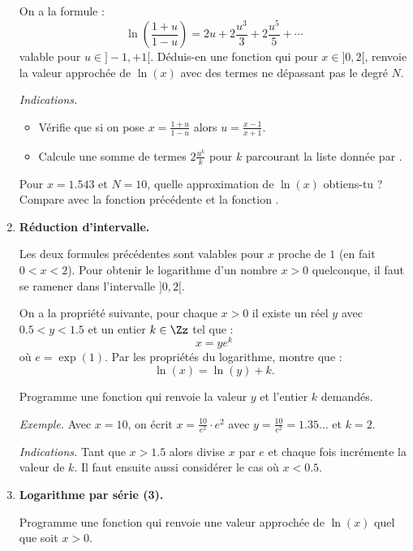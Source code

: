 \documentclass[11pt,class=report,crop=false]{standalone}
\begin{document}
\begin{activite}
\begin{enumerate}
    On a la formule :
    $$\ln\left(\frac{1+u}{1-u}\right) = 2u + 2\frac{u^3}{3} + 2\frac{u^5}{5}  + \cdots $$
    valable pour $u \in ]-1,+1[$.
    Déduis-en une fonction  qui pour $x \in ]0,2[$, renvoie la valeur approchée de $\ln(x)$ avec des termes ne dépassant pas le degré $N$. 
    
    \emph{Indications.}
    \begin{itemize}
      \item Vérifie que si on pose $x=\frac{1+u}{1-u}$ alors $u = \frac{x-1}{x+1}$.
            
      \item Calcule une somme de termes $2\frac{u^k}{k}$ pour $k$ parcourant la liste donnée par .
      
    \end{itemize}
       
    Pour $x = 1.543$ et $N=10$, quelle approximation de $\ln(x)$ obtiens-tu ? Compare avec la fonction précédente et la fonction \Python{}.
    
       
    \item \textbf{Réduction d'intervalle.} 
    
    Les deux formules précédentes sont valables pour $x$ proche de $1$ (en fait $0 < x < 2$). Pour obtenir le logarithme d'un nombre $x>0$ quelconque, il faut se ramener dans l'intervalle $]0,2[$.
    
    On a la propriété suivante, pour chaque $x>0$ il existe un réel $y$ avec $0.5 < y < 1.5$ et un entier $k \in \Zz$ tel que :
    $$x = y e^k$$
    où $e=\exp(1)$. Par les propriétés du logarithme, montre que :
    $$\ln(x) = \ln(y) + k.$$
    
    Programme une fonction  qui renvoie la valeur $y$ et l'entier $k$ demandés. 
    
    	\emph{Exemple.} Avec $x=10$, on écrit $x = \frac{10}{e^2} \cdot e^2$ avec
    	$y =\frac{10}{e^2} = 1.35\ldots$ et $k=2$.
    	
    \emph{Indications.} Tant que $x>1.5$ alors divise $x$ par $e$ et chaque fois incrémente la valeur de $k$. Il faut ensuite aussi considérer le cas où $x<0.5$.
      
    \item \textbf{Logarithme par série (3).} 

	Programme une fonction  qui renvoie une valeur approchée de $\ln(x)$ quel que soit $x>0$.
	

\end{enumerate}
\end{activite}
\end{document}
